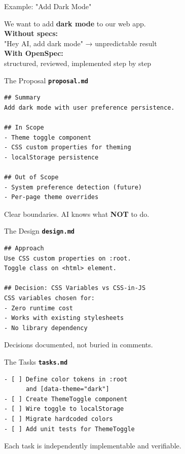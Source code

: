 \documentclass[aspectratio=169,18pt]{beamer}
\begin{document}

\begin{frame}{Example: "Add Dark Mode"}
  \vspace{1em}
  \begin{center}
    \Large We want to add \textbf{dark mode} to our web app.\\[1.5em]
    \normalsize
    \textbf{Without specs:}\\
    "Hey AI, add dark mode" → unpredictable result\\[1em]
    \textbf{With OpenSpec:}\\
    structured, reviewed, implemented step by step
  \end{center}
\end{frame}

\begin{frame}[fragile]{The Proposal}
  \textbf{\texttt{proposal.md}}\\[0.3em]
\begin{lstlisting}
## Summary
Add dark mode with user preference persistence.

## In Scope
- Theme toggle component
- CSS custom properties for theming
- localStorage persistence

## Out of Scope
- System preference detection (future)
- Per-page theme overrides
\end{lstlisting}
  \small\color{opengray}Clear boundaries. AI knows what \textbf{NOT} to do.
\end{frame}

\begin{frame}[fragile]{The Design}
  \textbf{\texttt{design.md}}\\[0.3em]
\begin{lstlisting}
## Approach
Use CSS custom properties on :root.
Toggle class on <html> element.

## Decision: CSS Variables vs CSS-in-JS
CSS variables chosen for:
- Zero runtime cost
- Works with existing stylesheets
- No library dependency
\end{lstlisting}
  \small\color{opengray}Decisions documented, not buried in comments.
\end{frame}

\begin{frame}[fragile]{The Tasks}
  \textbf{\texttt{tasks.md}}\\[0.3em]
\begin{lstlisting}
- [ ] Define color tokens in :root
      and [data-theme="dark"]
- [ ] Create ThemeToggle component
- [ ] Wire toggle to localStorage
- [ ] Migrate hardcoded colors
- [ ] Add unit tests for ThemeToggle
\end{lstlisting}
  \small\color{opengray}Each task is independently implementable and verifiable.
\end{frame}
\end{document}
